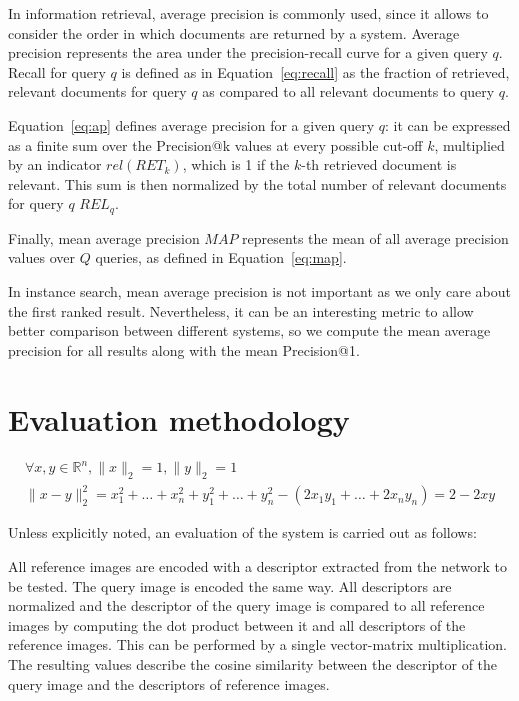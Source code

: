 In information retrieval, average precision is commonly used, since it
allows to consider the order in which documents are returned by a system.
Average precision represents the area under the precision-recall curve
for a given query $q$. Recall for query $q$ is defined as in
Equation~\ref{eq:recall} as the fraction of retrieved, relevant documents
for query $q$ as compared to all relevant documents to query $q$.

Equation~\ref{eq:ap} defines average precision for a given query $q$:
it can be expressed as a finite sum
over the Precision@k values at every possible cut-off $k$, multiplied by an
indicator $rel(RET_k)$, which is 1 if the $k$-th retrieved document is
relevant. This sum is then normalized by the total number of relevant
documents for query $q$ $REL_q$.

Finally, mean average precision $MAP$ represents the mean of all average
precision values over $Q$ queries, as defined in Equation~\ref{eq:map}.

In instance search, mean average precision is not important as we only
care about the first ranked result. Nevertheless, it can be an interesting
metric to allow better comparison between different systems, so we compute
the mean average precision for all results along with the mean Precision@1.

\section{Evaluation methodology}\label{sec:evalmethod}
\begin{equation}\label{eq:dotnorm}
\begin{array}{l}
\forall x, y \in \mathbb{R}^n, \|x\|_2 = 1, \|y\|_2 =1 \\
\| x - y \|_2^2
= x_1^2 + \dots + x_n^2 + y_1^2 + \dots + y_n^2 - (2x_1y_1 + \dots + 2x_ny_n)
= 2 - 2xy
\end{array}
\end{equation}

Unless explicitly noted, an evaluation of the system is carried out as
follows:

All reference images are encoded with a descriptor extracted from the
network to be tested. The query image is encoded the same way.
All descriptors are normalized and the descriptor of the query image
is compared to all reference images by computing the dot product between
it and all descriptors of the reference images. This can be performed
by a single vector-matrix multiplication. The resulting values describe
the cosine similarity between the descriptor of the query image
and the descriptors of reference images.


